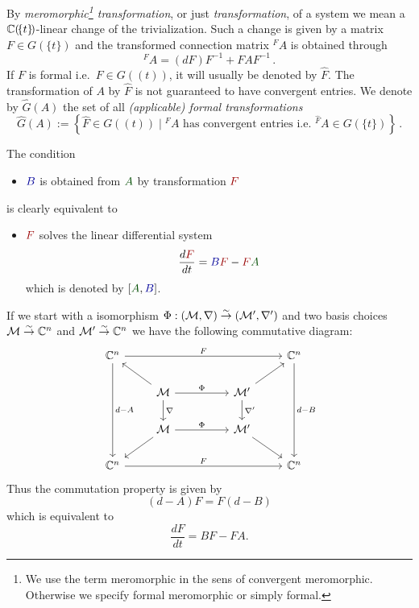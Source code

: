 By \emph{meromorphic\footnote{We use the term meromorphic in the sens of
convergent meromorphic. Otherwise we specify formal meromorphic or simply
formal.} transformation}, or just \emph{transformation}, of a system we mean a
$\mathbb{C}(\!\{t\}\!)$-linear change of the trivialization.  Such a change is given by
a matrix $F\in G(\!\{t\}\!)$ and the transformed connection matrix ${}^F\!A$ is
obtained through
\[
  {}^F\!A=(dF)F^{-1} + FAF^{-1} \,.
\]
If $F$ is formal i.e.\ $F\in G(\!(t)\!)$, it will usually be denoted by
$\hat F$.
The transformation of $A$ by $\hat F$ is not guaranteed to have convergent
entries.
We denote by $\hat G(A)$ the set of all \emph{(applicable) formal
transformations}
\[
  \hat G(A):=\left\{\hat F\in G(\!(t)\!)
    \mid {}^{\hat F}\!A \text{ has convergent entries i.e.\ }
    {}^{\hat F}\!A\in G(\!\{t\}\!)
  \right\}\,.
\]
\begin{rem}
  \def\myB{\textcolor{blue!60!black}{B}}
  \def\myA{\textcolor{green!30!black}{A}}
  \def\myF{\textcolor{red!60!black}{F}}
  The condition
  \begin{itemize}
    \item[] $\myB$ is obtained from $\myA$ by transformation $\myF$
  \end{itemize}
  is clearly equivalent to
  \begin{itemize}
    \item[]  $\myF$ solves the linear differential system
      \[
        \frac{d\myF}{dt}=\myB\myF-\myF\myA
      \]
      which is denoted by $[\myA,\myB]$.
  \end{itemize}
  \begin{s-rem}
    If we start with a isomorphism
    $\Phi:(\mathcal{M},\nabla)\overset{\sim}\to(\mathcal{M}',\nabla')$ and two basis choices
    $\mathcal{M}\overset{\sim}\to\mathbb{C}^n$ and $\mathcal{M}'\overset{\sim}\to\mathbb{C}^n$ we have the
    following commutative diagram:
    \[ \begin{tikzcd}
        \C^n \arrow{rrrr}{F}\arrow{ddd}{d-A}&&&& \C^n\arrow{ddd}{d-B}
        \\ & \cM \dar{\nabla}\arrow{rr}{\Phi}\ular&& \cM'\dar{\nabla'}\urar
        \\ & \cM \arrow{rr}{\Phi}\dlar&& \cM'\drar
        \\ \C^n \arrow{rrrr}{F}&&&& \C^n
    \end{tikzcd} \]
    Thus the commutation property is given by
    \[
      (d-A)F=F(d-B)
    \]
    which is equivalent \TODO[really] to
      \[
        \frac{dF}{dt}=BF-FA.
      \]
  \end{s-rem}
  \begin{comment}
    \begin{s-rem}
      $[A]=[0,A]$ \TODO[korrekt?]
    \end{s-rem}
  \end{comment}
\end{rem}
